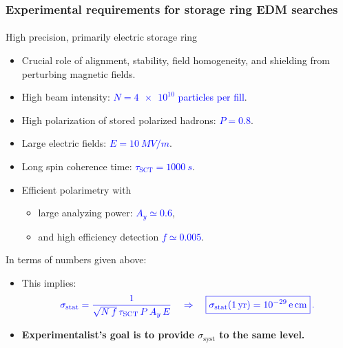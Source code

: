 \begin{frame}
\frametitle{Experimental requirements for storage ring EDM searches}
\framesubtitle{}

\vspace{-0.2cm}
\begin{block}{High precision, primarily electric storage ring}
 \begin{itemize}
  \item Crucial role of alignment, stability, field homogeneity, and shielding from perturbing magnetic fields.
  \item High beam intensity: \textcolor{blue}{$N = \num{4e10}$ particles per fill}.
  \item High polarization of stored polarized hadrons: \textcolor{blue}{$P=0.8$}.
  \item Large electric fields: \textcolor{blue}{$E = \SI{10}{MV/m}$}.
  \item Long spin coherence time: \textcolor{blue}{$\tau_\text{SCT} = \SI{1000}{s}$}.
  \item Efficient polarimetry with 
  \begin{itemize}
   \item large analyzing power:  \textcolor{blue}{$A_y \simeq 0.6$},
   \item  and high efficiency detection \textcolor{blue}{$f \simeq 0.005$}.
  \end{itemize}
 \end{itemize}
\end{block}

\vspace{-0.2cm}
\begin{alertblock}{In terms of numbers given above:}
\begin{itemize}
 \item This implies:
 \vspace{-0.3cm}
    \begin{equation}
   \textcolor{blue}{      
   \sigma_\text{stat} = \frac{1}{\sqrt{N \, f} \, \tau_\text{SCT} \, P \, A_y \, E} 
   \quad \Rightarrow \quad \boxed{\sigma_\text{stat}(\SI{1}{yr}) = \SI{e-29}{e.cm}}\,.} 
   \label{eq:statistical-error-EDM-experiment}
    \end{equation}
 \item \textbf{Experimentalist's goal is to provide $\sigma_\text{syst}$ to the same level.}
 \end{itemize}
\end{alertblock}

\end{frame}